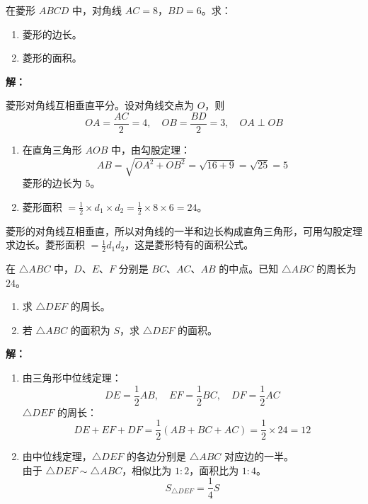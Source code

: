 \documentclass[12pt, a4paper]{ctexart}
\begin{document}
\vspace{6pt}

\begin{examplebox}
在菱形 $ABCD$ 中，对角线 $AC = 8$，$BD = 6$。求：
\begin{enumerate}[label=(\arabic*)]
  \item 菱形的边长。
  \item 菱形的面积。
\end{enumerate}
\end{examplebox}

\textbf{解：}

菱形对角线互相垂直平分。设对角线交点为 $O$，则
\[
OA = \frac{AC}{2} = 4, \quad OB = \frac{BD}{2} = 3, \quad OA \perp OB
\]

\begin{enumerate}[label=(\arabic*)]
  \item 在直角三角形 $AOB$ 中，由勾股定理：
  \[
  AB = \sqrt{OA^2 + OB^2} = \sqrt{16 + 9} = \sqrt{25} = 5
  \]
  菱形的边长为 $5$。

  \item 菱形面积 $= \frac{1}{2} \times d_1 \times d_2 = \frac{1}{2} \times 8 \times 6 = 24$。
\end{enumerate}

\begin{tipbox}[方法总结]
菱形的对角线互相垂直，所以对角线的一半和边长构成直角三角形，可用勾股定理求边长。菱形面积 $= \frac{1}{2} d_1 d_2$，这是菱形特有的面积公式。
\end{tipbox}

\vspace{6pt}

\begin{examplebox}
在 $\triangle ABC$ 中，$D$、$E$、$F$ 分别是 $BC$、$AC$、$AB$ 的中点。已知 $\triangle ABC$ 的周长为 $24$。
\begin{enumerate}[label=(\arabic*)]
  \item 求 $\triangle DEF$ 的周长。
  \item 若 $\triangle ABC$ 的面积为 $S$，求 $\triangle DEF$ 的面积。
\end{enumerate}
\end{examplebox}

\textbf{解：}
\begin{enumerate}[label=(\arabic*)]
  \item 由三角形中位线定理：
  \[
  DE = \frac{1}{2}AB, \quad EF = \frac{1}{2}BC, \quad DF = \frac{1}{2}AC
  \]
  $\triangle DEF$ 的周长：
  \[
  DE + EF + DF = \frac{1}{2}(AB + BC + AC) = \frac{1}{2} \times 24 = 12
  \]

  \item 由中位线定理，$\triangle DEF$ 的各边分别是 $\triangle ABC$ 对应边的一半。\\
  由于 $\triangle DEF \sim \triangle ABC$，相似比为 $1:2$，面积比为 $1:4$。
  \[
  S_{\triangle DEF} = \frac{1}{4}S
  \]
\end{enumerate}
\end{document}
